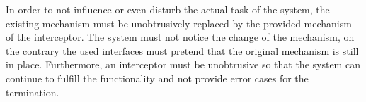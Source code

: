 In order to not influence or even disturb the actual task of the system, the existing mechanism must be unobtrusively replaced by the provided mechanism of the interceptor.
The system must not notice the change of the mechanism, on the contrary the used interfaces must pretend that the original mechanism is still in place.
Furthermore, an interceptor must be unobtrusive so that the system can continue to fulfill the functionality and not provide error cases for the termination.

